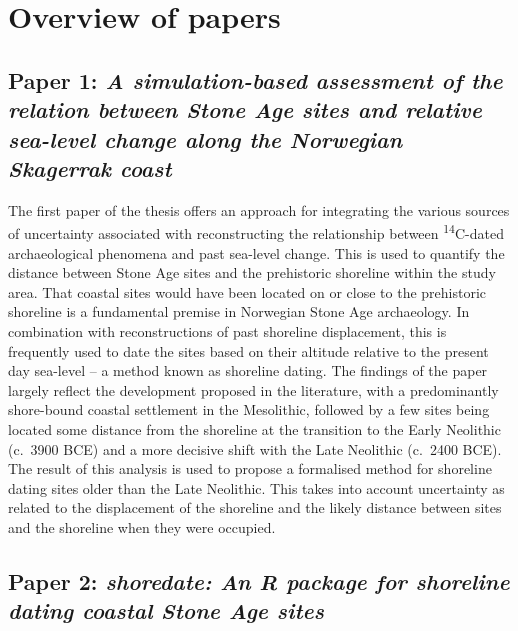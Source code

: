 \documentclass[
  12pt,
  a4paper,
  oneside]{book}
\begin{document}
\hypertarget{overview-of-papers}{%
\section{Overview of papers}\label{overview-of-papers}}

\hypertarget{paper-1-a-simulation-based-assessment-of-the-relation-between-stone-age-sites-and-relative-sea-level-change-along-the-norwegian-skagerrak-coast}{%
\subsection{\texorpdfstring{Paper 1: \emph{A simulation-based assessment of the relation between Stone Age sites and relative sea-level change along the Norwegian Skagerrak coast}}{Paper 1: A simulation-based assessment of the relation between Stone Age sites and relative sea-level change along the Norwegian Skagerrak coast}}\label{paper-1-a-simulation-based-assessment-of-the-relation-between-stone-age-sites-and-relative-sea-level-change-along-the-norwegian-skagerrak-coast}}

The first paper of the thesis offers an approach for integrating the various sources of uncertainty associated with reconstructing the relationship between \textsuperscript{14}C-dated archaeological phenomena and past sea-level change. This is used to quantify the distance between Stone Age sites and the prehistoric shoreline within the study area. That coastal sites would have been located on or close to the prehistoric shoreline is a fundamental premise in Norwegian Stone Age archaeology. In combination with reconstructions of past shoreline displacement, this is frequently used to date the sites based on their altitude relative to the present day sea-level -- a method known as shoreline dating. The findings of the paper largely reflect the development proposed in the literature, with a predominantly shore-bound coastal settlement in the Mesolithic, followed by a few sites being located some distance from the shoreline at the transition to the Early Neolithic (c.~3900 BCE) and a more decisive shift with the Late Neolithic (c.~2400 BCE). The result of this analysis is used to propose a formalised method for shoreline dating sites older than the Late Neolithic. This takes into account uncertainty as related to the displacement of the shoreline and the likely distance between sites and the shoreline when they were occupied.

\hypertarget{paper-2-shoredate-an-r-package-for-shoreline-dating-coastal-stone-age-sites}{%
\subsection{\texorpdfstring{Paper 2: \emph{shoredate: An R package for shoreline dating coastal Stone Age sites}}{Paper 2: shoredate: An R package for shoreline dating coastal Stone Age sites}}\label{paper-2-shoredate-an-r-package-for-shoreline-dating-coastal-stone-age-sites}}
\end{document}
